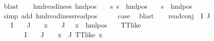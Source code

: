 \begin{isabellebody}
\ blast\isanewline
\ \ \isamarkupfalse%
\ {\isachardoublequoteopen}hml{\isacharunderscore}{\kern0pt}readiness\ {\isacharparenleft}{\kern0pt}hml{\isacharunderscore}{\kern0pt}pos\ {\isasymalpha}\ {\isasympsi}{\isacharparenright}{\kern0pt}\ {\isasymand}\ {\isacharparenleft}{\kern0pt}{\isasymforall}s{\isachardot}{\kern0pt}\ {\isacharparenleft}{\kern0pt}s\ {\isasymTurnstile}\ hml{\isacharunderscore}{\kern0pt}pos\ {\isasymalpha}\ {\isasymphi}{\isacharparenright}{\kern0pt}\ {\isacharequal}{\kern0pt}\ {\isacharparenleft}{\kern0pt}s\ {\isasymTurnstile}\ {\isacharparenleft}{\kern0pt}hml{\isacharunderscore}{\kern0pt}pos\ {\isasymalpha}\ {\isasympsi}{\isacharparenright}{\kern0pt}{\isacharparenright}{\kern0pt}{\isacharparenright}{\kern0pt}{\isachardoublequoteclose}\isanewline
\ \ \ \ \isamarkupfalse%
\ {\isacharparenleft}{\kern0pt}simp\ add{\isacharcolon}{\kern0pt}\ hml{\isacharunderscore}{\kern0pt}readiness{\isachardot}{\kern0pt}read{\isacharunderscore}{\kern0pt}pos{\isacharparenright}{\kern0pt}\isanewline
\ \ \isamarkupfalse%
\ \isamarkupfalse%
\ {\isacharquery}{\kern0pt}case\ \isamarkupfalse%
\ blast\isanewline
{}\isamarkupfalse%
\isanewline
\ \ \isamarkupfalse%
\ {\isacharparenleft}{\kern0pt}read{\isacharunderscore}{\kern0pt}conj\ {\isasymPhi}\ I\ J{\isacharparenright}{\kern0pt}\isanewline
\ \ \isamarkupfalse%
\ \isamarkupfalse%
\ {\isachardoublequoteopen}{\isasymPhi}\ {\isacharbackquote}{\kern0pt}\ I\ {\isasyminter}\ {\isasymPhi}\ {\isacharbackquote}{\kern0pt}\ J\ {\isacharequal}{\kern0pt}\ {\isacharbraceleft}{\kern0pt}{\isacharbraceright}{\kern0pt}\ {\isasymand}\ {\isacharparenleft}{\kern0pt}{\isasymforall}x\ {\isasymin}\ {\isacharparenleft}{\kern0pt}{\isasymPhi}\ {\isacharbackquote}{\kern0pt}\ J{\isacharparenright}{\kern0pt}{\isachardot}{\kern0pt}\ {\isacharparenleft}{\kern0pt}{\isasymexists}{\isasymalpha}\ {\isasymchi}{\isachardot}{\kern0pt}\ x\ {\isacharequal}{\kern0pt}\ hml{\isacharunderscore}{\kern0pt}pos\ {\isasymalpha}\ {\isasymchi}\ {\isasymand}\ TT{\isacharunderscore}{\kern0pt}like\ {\isasymchi}{\isacharparenright}{\kern0pt}{\isacharparenright}{\kern0pt}{\isachardoublequoteclose}\isanewline
\ \ \ \ {\isacharbar}{\kern0pt}\ {\isachardoublequoteopen}{\isasymPhi}\ {\isacharbackquote}{\kern0pt}\ I\ {\isasyminter}\ {\isasymPhi}\ {\isacharbackquote}{\kern0pt}\ J\ {\isasymnoteq}\ {\isacharbraceleft}{\kern0pt}{\isacharbraceright}{\kern0pt}\ {\isasymor}\ {\isacharparenleft}{\kern0pt}{\isasymexists}x\ {\isasymin}{\isasymPhi}{\isacharbackquote}{\kern0pt}\ J{\isachardot}{\kern0pt}\ {\isacharparenleft}{\kern0pt}TT{\isacharunderscore}{\kern0pt}like\ x{\isacharparenright}{\kern0pt}{\isacharparenright}{\kern0pt}{\isachardoublequoteclose}\ \isanewline

\end{isabellebody}
